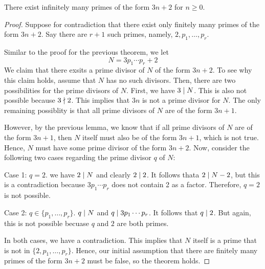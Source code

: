 \begin{theorem}
    There exist infinitely many primes of the form $3n+2$ for $n \geq 0$.
\end{theorem}

\begin{proof}
    Suppose for contradiction that there exist only finitely many primes of the form $3n + 2$. Say there are $r+1$ such primes, namely, $2,p_1,\ldots,p_r$.

    Similar to the proof for the previous theorem, we let
    $$
    N = 3p_1\cdots p_r + 2
    $$
    We claim that there exsits a prime divisor of $N$ of the form $3n+2$. To see why this claim holds, assume that $N$ has no such divisors. Then, there are two possibilities for the prime divisors of $N$. First, we have $3 \mathrel{\mid} N$. This is also not possible because $3 \mathrel{\nmid} 2$. This implies that $3n$ is not a prime divisor for $N$. The only remaining possiblity is that all prime divisors of $N$ are of the form $3n + 1$.

    However, by the previous lemma, we know that if all prime divisors of $N$ are of the form $3n + 1$, then $N$ itself must also be of the form $3n + 1$, which is not true. Hence, $N$ must have some prime divisor of the form $3n + 2$. Now, consider the following two cases regarding the prime divisor $q$ of $N$:

    Case 1: $q=2$. we have $2 \mathrel{\mid} N$ and clearly $2 \mathrel{\mid} 2$. It follows thata $2 \mathrel{\mid} N - 2$, but this is a contradiction because $3p_1\cdots p_r$ does not contain 2 as a factor. Therefore, $q=2$ is not possible.

    Case 2: $q \in \{p_1,\ldots,p_r\}$. $q \mathrel{\mid} N$ and $q \mathrel{\mid} 3p_1\cdots p_r$. It follows that $q \mathrel{\mid} 2$. But again, this is not possible becuase $q$ and $2$ are both primes.

    In both cases, we have a contradiction. This implies that $N$ itself is a prime that is not in $\{2,p_1,\ldots,p_r\}$. Hence, our initial assumption that there are finitely many primes of the form $3n + 2$ must be false, so the theorem holds.
\end{proof}

